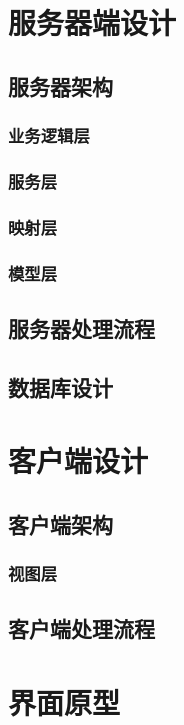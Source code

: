 \documentclass[12pt]{ctexart} %
\begin{document}
\section{服务器端设计}

\subsection{服务器架构}
\subsubsection{业务逻辑层}
\subsubsection{服务层}
\subsubsection{映射层}
\subsubsection{模型层}
\subsection{服务器处理流程}
\subsection{数据库设计}


\section{客户端设计}

\subsection{客户端架构}



\subsubsection{视图层}
\subsection{客户端处理流程}

\section{界面原型}
\end{document}
